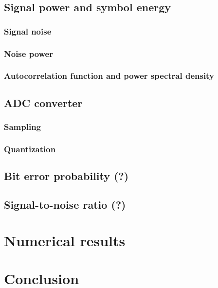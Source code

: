 \documentclass[twocolumn]{article}
\begin{document}
\subsection{Signal power and symbol energy}

\subsubsection{Signal noise}
\subsubsection{Noise power}
\subsubsection{Autocorrelation function and power spectral density}

\subsection{ADC converter}
\subsubsection{Sampling}
\subsubsection{Quantization}

\subsection{Bit error probability (?)}

\subsection{Signal-to-noise ratio (?)}

\section{Numerical results}

\section{Conclusion}
\end{document}
